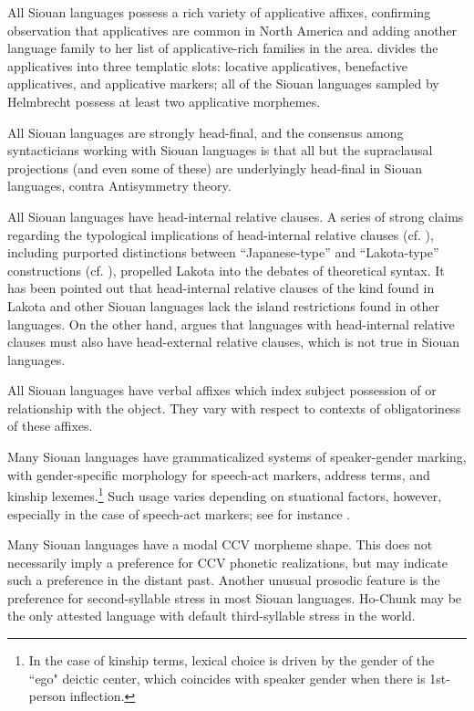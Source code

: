 \begin{refsection}
All Siouan languages possess a rich variety of applicative affixes, confirming  observation that applicatives are common in North America and adding another language family to her list of applicative-rich families in the area. \citet{Helmbrecht2006} divides the applicatives into three templatic slots: locative applicatives, benefactive applicatives, and applicative markers; all of the Siouan languages sampled by Helmbrecht possess at least two applicative morphemes.


All Siouan languages are strongly head-final, and the consensus among syntacticians working with Siouan languages is that all but the supraclausal projections (and even some of these) are underlyingly head-final in Siouan languages, contra  Antisymmetry theory.


All Siouan languages have head-internal relative clauses. A series of strong claims regarding the typological implications of head-internal relative clauses (cf. \citealt{Cole1987, Murasugi2000}), including purported distinctions between ``Japanese-type'' and ``Lakota-type'' constructions (cf. \citealt{Watanabe2004,Williamson1987,Bonneau1992}), propelled Lakota into the debates of theoretical syntax. It has been pointed out that head-internal relative clauses of the kind found in Lakota and other Siouan languages lack the island restrictions found in other languages. On the other hand, \citet{Murasugi2000} argues that languages with head-internal relative clauses must also have head-external relative clauses, which is not true in Siouan languages.


All Siouan languages have verbal affixes which index subject possession of or relationship with the object. They vary with respect to contexts of obligatoriness of these affixes.


Many Siouan languages have grammaticalized systems of speaker-gender marking, with gender-specific morphology for speech-act markers, address terms, and kinship lexemes.\footnote{In the case of kinship terms, lexical choice is driven by the gender of the ``ego" deictic center, which coincides with speaker gender when there is 1st-person inflection.} Such usage varies depending on stuational factors, however, especially in the case of speech-act markers; see for instance \citet{Trechter1995}.   


Many Siouan languages have a modal CCV morpheme shape. This does not necessarily imply a preference for CCV phonetic realizations, but may indicate such a preference in the distant past. Another unusual prosodic feature is the preference for second-syllable stress in most Siouan languages. Ho-Chunk may be the only attested language with default third-syllable stress in the world.



\end{refsection}

